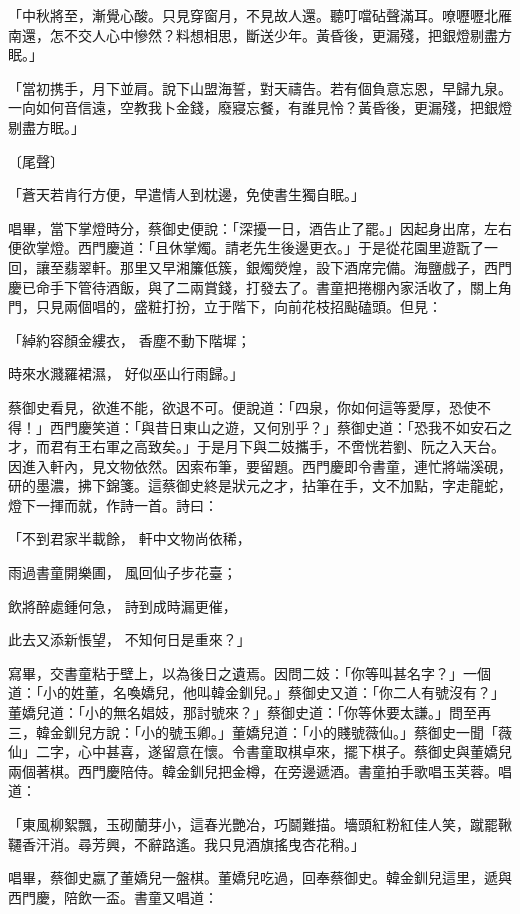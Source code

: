 \begin{showcontents}{}
「中秋將至，漸覺心酸。只見穿窗月，不見故人還。聽叮噹砧聲滿耳。嘹嚦嚦北雁南還，怎不交人心中慘然？料想相思，斷送少年。黃昏後，更漏殘，把銀燈剔盡方眠。」

「當初携手，月下並肩。說下山盟海誓，對天禱告。若有個負意忘恩，早歸九泉。一向如何音信遠，空教我卜金錢，廢寢忘餐，有誰見怜？黃昏後，更漏殘，把銀燈剔盡方眠。」

〔尾聲〕

「蒼天若肯行方便，早遣情人到枕邊，免使書生獨自眠。」

唱畢，當下掌燈時分，蔡御史便說：「深擾一日，酒告止了罷。」因起身出席，左右便欲掌燈。西門慶道：「且休掌燭。請老先生後邊更衣。」于是從花園里遊翫了一回，讓至翡翠軒。那里又早湘簾低簇，銀燭熒煌，設下酒席完備。海鹽戲子，西門慶已命手下管待酒飯，與了二兩賞錢，打發去了。書童把捲棚內家活收了，關上角門，只見兩個唱的，盛粧打扮，立于階下，向前花枝招颭磕頭。但見：

「綽約容顏金縷衣， 香塵不動下階墀；

時來水濺羅裙濕， 好似巫山行雨歸。」

蔡御史看見，欲進不能，欲退不可。便說道：「四泉，你如何這等愛厚，恐使不得！」西門慶笑道：「與昔日東山之遊，又何別乎？」蔡御史道：「恐我不如安石之才，而君有王右軍之高致矣。」于是月下與二妓攜手，不啻恍若劉、阮之入天台。因進入軒內，見文物依然。因索布筆，要留題。西門慶即令書童，連忙將端溪硯，研的墨濃，拂下錦箋。這蔡御史終是狀元之才，拈筆在手，文不加點，字走龍蛇，燈下一揮而就，作詩一首。詩曰：

「不到君家半載餘，  軒中文物尚依稀，

雨過書童開樂圃，  風回仙子步花臺；

飲將醉處鍾何急，  詩到成時漏更催，

此去又添新悵望，  不知何日是重來？」

寫畢，交書童粘于壁上，以為後日之遺焉。因問二妓：「你等叫甚名字？」一個道：「小的姓董，名喚嬌兒，他叫韓金釧兒。」蔡御史又道：「你二人有號沒有？」董嬌兒道：「小的無名娼妓，那討號來？」蔡御史道：「你等休要太謙。」問至再三，韓金釧兒方說：「小的號玉卿。」董嬌兒道：「小的賤號薇仙。」蔡御史一聞「薇仙」二字，心中甚喜，遂留意在懷。令書童取棋卓來，擺下棋子。蔡御史與董嬌兒兩個著棋。西門慶陪侍。韓金釧兒把金樽，在旁邊遞酒。書童拍手歌唱玉芙蓉。唱道：

「東風柳絮飄，玉砌蘭芽小，這春光艷冶，巧鬬難描。墻頭紅粉紅佳人笑，蹴罷鞦韆香汗消。尋芳興，不辭路遙。我只見酒旗搖曳杏花稍。」

唱畢，蔡御史嬴了董嬌兒一盤棋。董嬌兒吃過，回奉蔡御史。韓金釧兒這里，遞與西門慶，陪飲一盃。書童又唱道：


\end{showcontents}
